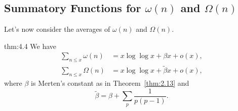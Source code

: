 \subsection{Summatory Functions for $\omega(n)$ and $\Omega(n)$}\label{subsec:4.2} 
Let's now consider the averages of $\omega(n)$ and $\Omega(n)$. 

\begin{theo}{thm:4.4}
    We have 
    \begin{align*}
        \sum_{n\leq x} \omega(n) &= x\log\log x + \beta x + o(x), \\ 
        \sum_{n\leq x} \Omega(n) &= x\log\log x + \tilde\beta x + o(x), 
    \end{align*}
    where $\beta$ is Merten's constant as in Theorem~\ref{thm:2.13} and 
    \[ \tilde\beta = \beta + \sum_p \frac{1}{p(p-1)}. \] 
\end{theo}
